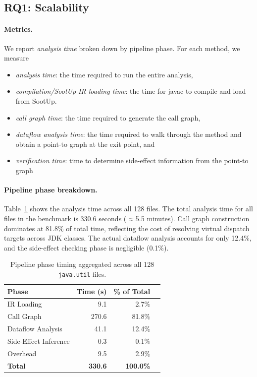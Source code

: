 \subsection{RQ1: Scalability}


\paragraph{Metrics.}
We report \emph{analysis time} broken down by pipeline phase. For each method, we measure
\begin{itemize}  
\item \textit{analysis time}: the time required to run the entire analysis, 
\item \textit{compilation/SootUp IR loading time}: the time for javac to compile and load from SootUp.  
\item \textit{call graph time}: the time required to generate the call graph,
\item \textit{dataflow analysis time}: the time required to walk through the method and obtain a point-to graph at the exit point, and
\item \textit{verification time}: time to determine side-effect information from the point-to graph 
\end{itemize}


\paragraph{Pipeline phase breakdown.}
Table~\ref{tab:pipeline} shows the analysis time across all 128 files.
The total analysis time for all files in the benchmark is 330.6 seconds ($\approx$5.5 minutes).
Call graph construction dominates at 81.8\% of total time, reflecting the cost of resolving virtual dispatch targets across JDK classes.
The actual dataflow analysis accounts for only 12.4\%, and the side-effect checking phase is negligible (0.1\%).

\begin{table}[h]
\centering
\caption{Pipeline phase timing aggregated across all 128 \texttt{java.util} files.}
\label{tab:pipeline}
\begin{tabular}{lrrr}
\toprule
\textbf{Phase} & \textbf{Time (s)} & \textbf{\% of Total} \\
\midrule
IR Loading          &    9.1 &  2.7\% \\
Call Graph          &  270.6 & 81.8\% \\
Dataflow Analysis   &   41.1 & 12.4\% \\
Side-Effect Inference   &    0.3 &  0.1\% \\
Overhead            &    9.5 &  2.9\% \\
\midrule
\textbf{Total}      & \textbf{330.6} & \textbf{100.0\%} \\
\bottomrule
\end{tabular}
\end{table}

